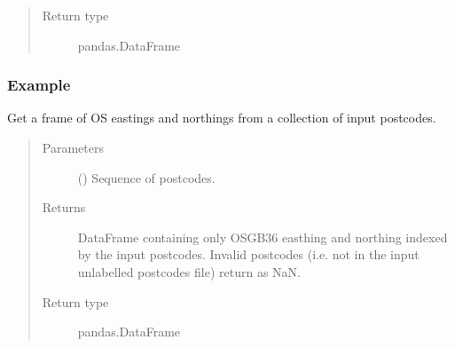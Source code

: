 \documentclass[letterpaper,10pt,english]{sphinxmanual}
\begin{document}
\begin{fulllineitems}
\begin{fulllineitems}
\begin{quote}
\begin{description}
\item[{Return type}] \leavevmode
\sphinxAtStartPar
pandas.DataFrame

\end{description}\end{quote}
\subsubsection*{Example}

\begin{sphinxVerbatim}[commandchars=\\\{\}]
\end{sphinxVerbatim}

\end{fulllineitems}


\begin{fulllineitems}
\label{\detokenize{index:flood_tool.Tool.get_easting_northing}}
\sphinxAtStartPar
Get a frame of OS eastings and northings from a collection
of input postcodes.
\begin{quote}\begin{description}
\item[{Parameters}] \leavevmode
\sphinxAtStartPar
{} () \textendash{} Sequence of postcodes.

\item[{Returns}] \leavevmode
\sphinxAtStartPar
DataFrame containing only OSGB36 easthing and northing indexed
by the input postcodes. Invalid postcodes (i.e. not in the
input unlabelled postcodes file) return as NaN.

\item[{Return type}] \leavevmode
\sphinxAtStartPar
pandas.DataFrame

\end{description}\end{quote}

\end{fulllineitems}
\end{fulllineitems}
\end{document}

